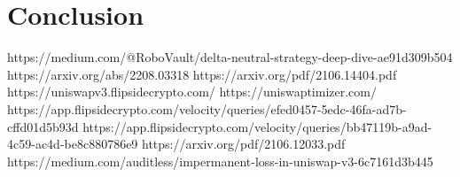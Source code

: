 \documentclass[conference]{IEEEtran}
\begin{document}



\section{Conclusion}
https://medium.com/@RoboVault/delta-neutral-strategy-deep-dive-ae91d309b504
https://arxiv.org/abs/2208.03318
https://arxiv.org/pdf/2106.14404.pdf
https://uniswapv3.flipsidecrypto.com/
https://uniswaptimizer.com/
https://app.flipsidecrypto.com/velocity/queries/efed0457-5edc-46fa-ad7b-cffd01d5b93d
https://app.flipsidecrypto.com/velocity/queries/bb47119b-a9ad-4c59-ac4d-be8c880786e9
https://arxiv.org/pdf/2106.12033.pdf
https://medium.com/auditless/impermanent-loss-in-uniswap-v3-6c7161d3b445 



\nocite{*}
\end{document}
